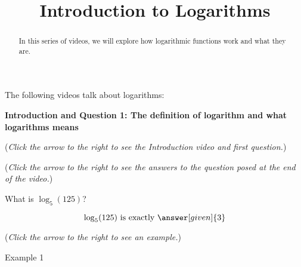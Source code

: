 \documentclass{ximera}
\title[Prerequisite Videos: ]{Introduction to Logarithms}
\begin{document}
\begin{abstract}
  In this series of videos, we will explore how logarithmic functions
  work and what they are.
\end{abstract}
\maketitle

The following videos talk about logarithms:

\textbf{Introduction and Question 1: The definition of logarithm and what
logarithms means}
\begin{question}
\begin{flushright}
{\color{blue}(\emph{Click the arrow to the right to see the Introduction video and first question.})}
\end{flushright}
\begin{center}
\begin{expandable}
{\color{blue}(\emph{Click the arrow to the right to see the answers 
to the question posed at the end of the video.})}
\begin{expandable}
What is $\log_5(125)$?
\begin{prompt}
\[
\log_5(125) \text{ is exactly }\answer[given]{3}
\]
\end{prompt}
\begin{flushright}
{\color{blue}(\emph{Click the arrow to the right to see an example.})}
\end{flushright}
\begin{expandable}
Example 1
\end{expandable}
\end{expandable}
\end{expandable}
\end{center}
\end{question}
\end{document}

